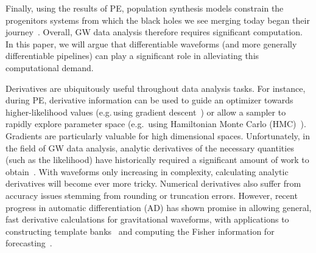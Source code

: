 \documentclass[twocolumn]{aastex631}
\newcommand{\te}[1]{\textbf{\color{pyGreen}(TE: #1)}}
\newcommand{\kw}[1]{{\color{rb4}[KW: #1 ]}}
\newcommand{\AZ}[1]{{\color{Burnt}[AZ: #1]}}
\newcommand{\dfm}[1]{{\color{dfm}[DFM: #1]}}
\begin{document}
Finally, using the results of PE, population synthesis models constrain the progenitors systems from which the black holes we see merging today began their journey~\citep{LIGOScientific:2020kqk, LIGOScientific:2021psn, Wong:2022flg}.
Overall, GW data analysis therefore requires significant computation.
In this paper, we will argue that differentiable waveforms (and more generally differentiable pipelines) can play a significant role in alleviating this computational demand.

Derivatives are ubiquitously useful throughout data analysis tasks.
For instance, during PE, derivative information can be used to guide an optimizer towards higher-likelihood values (e.g.\,using gradient descent~\citep{2016arXiv160904747R}) or allow a sampler to rapidly explore parameter space (e.g.\, using Hamiltonian Monte Carlo (HMC)~\citep{2011hmcm.book..113N,2017arXiv170102434B}).
Gradients are particularly valuable for high dimensional spaces.
Unfortunately, in the field of GW data analysis, analytic derivatives of the necessary quantities (such as the likelihood) have historically required a significant amount of work to obtain~\citep{Keppel:2013kia}.
With waveforms only increasing in complexity, calculating analytic derivatives will become ever more tricky.
Numerical derivatives also suffer from accuracy issues stemming from rounding or truncation errors.
However, recent progress in automatic differentiation (AD) has shown promise in allowing general, fast derivative calculations for gravitational waveforms, with applications to constructing template banks~\citep{Coogan:2022qxs} and computing the Fisher information for forecasting~\citep{Iacovelli:2022bbs, Iacovelli:2022mbg}.
\end{document}

